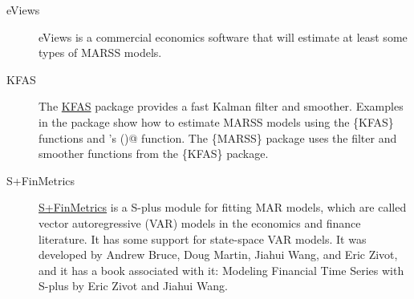 \begin{description}
	\item[eViews] eViews is a commercial economics software that will estimate at least some types of MARSS models.
	
	\item[KFAS] The \href{https://cran.r-project.org/package=KFAS}{KFAS} \R package provides a fast Kalman filter and smoother.  Examples in the package show how to estimate MARSS models using the \{KFAS\} functions and \R's \verb@optim()@ function.   The \{MARSS\} package uses the filter and smoother functions from the \{KFAS\} package.
	
		\item[S+FinMetrics] \href{http://faculty.washington.edu/ezivot/MFTS2ndEditionFinMetrics.htm}{S+FinMetrics} is a S-plus module for fitting MAR models, which are called vector autoregressive (VAR) models in the economics and finance literature.  It has some support for state-space VAR models.  It was developed by Andrew Bruce, Doug Martin, Jiahui Wang, and Eric Zivot, and it has a book associated with it: Modeling Financial Time Series with S-plus by Eric Zivot and Jiahui Wang.
		
\end{description}